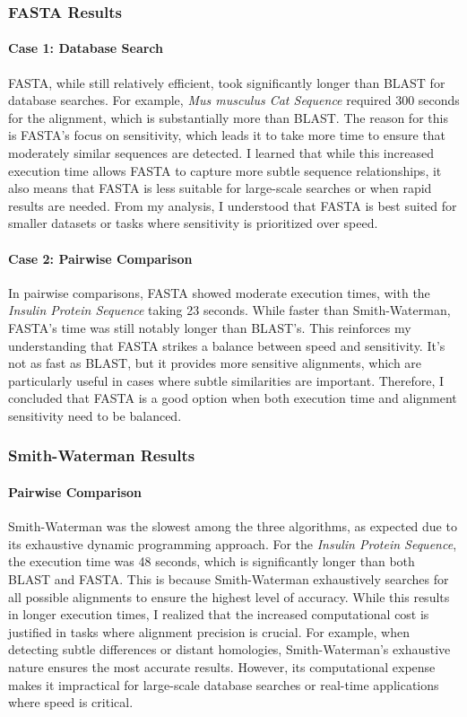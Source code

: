 \documentclass{article}
\begin{document}
\subsubsection{ FASTA Results}

\paragraph{Case 1: Database Search}
FASTA, while still relatively efficient, took significantly longer than BLAST for database searches. For example, \textit{Mus musculus Cat Sequence} required 300 seconds for the alignment, which is substantially more than BLAST. The reason for this is FASTA’s focus on sensitivity, which leads it to take more time to ensure that moderately similar sequences are detected. I learned that while this increased execution time allows FASTA to capture more subtle sequence relationships, it also means that FASTA is less suitable for large-scale searches or when rapid results are needed. From my analysis, I understood that FASTA is best suited for smaller datasets or tasks where sensitivity is prioritized over speed.

\paragraph{Case 2: Pairwise Comparison}
In pairwise comparisons, FASTA showed moderate execution times, with the \textit{Insulin Protein Sequence} taking 23 seconds. While faster than Smith-Waterman, FASTA’s time was still notably longer than BLAST’s. This reinforces my understanding that FASTA strikes a balance between speed and sensitivity. It’s not as fast as BLAST, but it provides more sensitive alignments, which are particularly useful in cases where subtle similarities are important. Therefore, I concluded that FASTA is a good option when both execution time and alignment sensitivity need to be balanced.

\subsubsection{ Smith-Waterman Results}

\paragraph{Pairwise Comparison}
Smith-Waterman was the slowest among the three algorithms, as expected due to its exhaustive dynamic programming approach. For the \textit{Insulin Protein Sequence}, the execution time was 48 seconds, which is significantly longer than both BLAST and FASTA. This is because Smith-Waterman exhaustively searches for all possible alignments to ensure the highest level of accuracy. While this results in longer execution times, I realized that the increased computational cost is justified in tasks where alignment precision is crucial. For example, when detecting subtle differences or distant homologies, Smith-Waterman’s exhaustive nature ensures the most accurate results. However, its computational expense makes it impractical for large-scale database searches or real-time applications where speed is critical.
\end{document}
